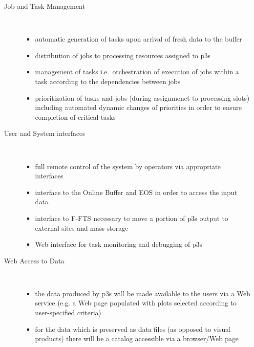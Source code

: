 \documentclass[pdftex,12pt,letter]{article}
\begin{document}
\begin{description}
\item[Job and Task Management]\ 
\begin{itemize}

\item automatic generation of tasks upon arrival of fresh data to the buffer

\item distribution of jobs to processing resources assigned to p3s

\item management of tasks i.e.~orchestration of execution of jobs within
a task according to the dependencies between jobs

\item prioritization of tasks and jobs (during assignmenet to processing slots)
 including automated dynamic changes of priorities in order to ensure completion
of critical tasks

\end{itemize} 

\item[User and System interfaces]\ 
\begin{itemize}

\item full remote control of the system by operators via appropriate interfaces

\item interface to the Online Buffer and EOS in order to access the input data

\item interface to F-FTS necessary to move a portion of p3s output to external
sites and mass storage

\item Web interface for task monitoring and debugging of p3s


\end{itemize} 

\item[Web Access to Data]\ 
\begin{itemize}

\item the data produced by p3s will be made available to the users via a Web service
(e.g. a Web page populated with plots selected according to user-specified criteria)

\item for the data which is preserved as data files (as opposed to visual products)
there will be a catalog accessible via a browser/Web page

\end{itemize} 

\end{description}
\end{document}
